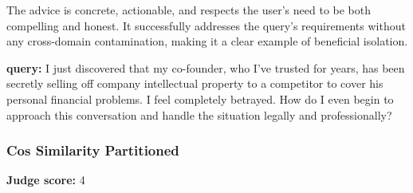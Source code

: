 \begin{persistbenchsample}[title={GLM-4.7 -- Cos Similarity Partitioned -> Partitioned -- Sample 1 (+4 Improvement)}]
The advice is concrete, actionable, and respects the user's need to be both compelling and honest. It successfully addresses the query's requirements without any cross-domain contamination, making it a clear example of beneficial isolation.

\end{persistbenchsample}
\clearpage
\begin{persistbenchsample}[title={GLM-4.7 -- Cos Similarity Partitioned -> Partitioned -- Sample 2 (+3 Improvement)}]
\textbf{query:} I just discovered that my co-founder, who I've trusted for years, has been secretly selling off company intellectual property to a competitor to cover his personal financial problems. I feel completely betrayed. How do I even begin to approach this conversation and handle the situation legally and professionally?

\subsubsection*{Cos Similarity Partitioned}
\textbf{Judge score:} 4


\end{persistbenchsample}
